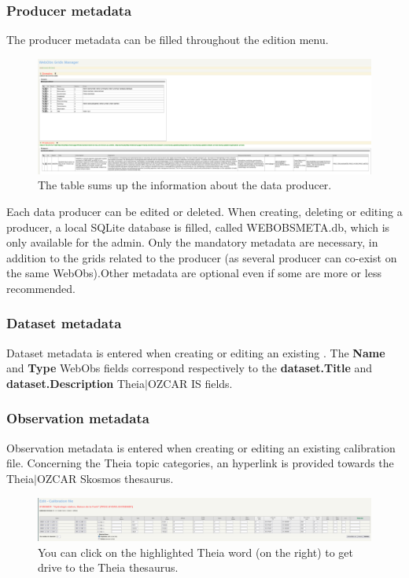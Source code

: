 \subsubsection{Producer metadata}

The producer metadata can be filled throughout the  edition menu. 

\begin{figure}[!h]
	\centering
	\includegraphics[width=\textwidth]{figures/gridsMgr.png}
	\caption{The table sums up the information about the data producer.}
\end{figure}

Each data producer can be edited or deleted. When creating, deleting or editing a producer, a local SQLite database is filled,  called WEBOBSMETA.db, which is only available for the admin. Only the mandatory metadata are necessary, in addition to the grids related to the producer (as several producer can co-exist on the same WebObs).Other metadata are optional even if some are more or less recommended.

\subsubsection{Dataset metadata}

Dataset metadata is entered when creating or editing an existing . The \textbf{Name} and \textbf{Type} WebObs  fields correspond respectively to the \textbf{dataset.Title} and \textbf{dataset.Description} Theia$\vert$OZCAR IS fields.

\subsubsection{Observation metadata}

Observation metadata is entered when creating or editing an existing calibration file. Concerning the Theia topic categories, an hyperlink is provided towards the Theia$\vert$OZCAR Skosmos thesaurus.

\begin{figure}[!h]
	\centering
	\includegraphics[width=\textwidth]{figures/calib_file_form.png}
	\caption{You can click on the highlighted Theia word (on the right) to get drive to the Theia thesaurus.}
\end{figure}

